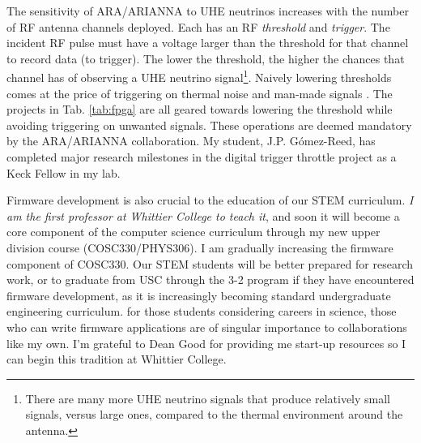 \documentclass[../../main.tex]{subfiles}
\begin{document}
The sensitivity of ARA/ARIANNA to UHE neutrinos increases with the number of RF antenna channels deployed.  Each has an RF \textit{threshold} and \textit{trigger}.  The incident RF pulse must have a voltage larger than the threshold for that channel to record data (to trigger).  The lower the threshold, the higher the chances that channel has of observing a UHE neutrino signal\footnote{There are many more UHE neutrino signals that produce relatively small signals, versus large ones, compared to the thermal environment around the antenna.}.  Naively lowering thresholds comes at the price of triggering on thermal noise and man-made signals \cite{ALLISON201847} \cite{barwick2016radio}.  The projects in Tab. \ref{tab:fpga} are all geared towards lowering the threshold while avoiding triggering on unwanted signals.  These operations are deemed mandatory by the ARA/ARIANNA collaboration.  My student, J.P. G\'{o}mez-Reed, has completed major research milestones in the digital trigger throttle project as a Keck Fellow in my lab. \\ \hspace{0.1cm}

Firmware development is also crucial to the education of our STEM curriculum.  \textit{I am the first professor at Whittier College to teach it}, and soon it will become a core component of the computer science curriculum through my new upper division course (COSC330/PHYS306).  I am gradually increasing the firmware component of COSC330.  Our STEM students will be better prepared for research work, or to graduate from USC through the 3-2 program if they have encountered firmware development, as it is increasingly becoming standard undergraduate engineering curriculum.  for those students considering careers in science, those who can write firmware applications are of singular importance to collaborations like my own.  I'm grateful to Dean Good for providing me start-up resources so I can begin this tradition at Whittier College.
\end{document}
